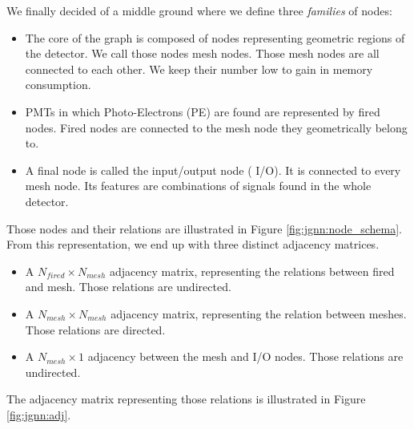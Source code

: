 \documentclass[../main.tex]{subfiles}
\begin{document}
We finally decided of a middle ground where we define three \textit{families} of nodes:
\begin{itemize}
  \item The core of the graph is composed of nodes representing geometric regions of the detector. We call those nodes {\color{Dandelion} mesh} nodes. Those mesh nodes are all connected to each other. We keep their number low to gain in memory consumption.
  \item PMTs in which Photo-Electrons (PE) are found are represented by {\color{red} fired} nodes. Fired nodes are connected to the mesh node they geometrically belong to.
  \item A final node is called the input/output node ({\color{blue} I/O}). It is connected to every mesh node.  Its features are combinations of signals found in the whole detector.
\end{itemize}

\hfill

Those nodes and their relations are illustrated in Figure \ref{fig:jgnn:node_schema}. From this representation, we end up with three distinct adjacency matrices.
\begin{itemize}
  \item A $N_{fired} \times N_{mesh}$ adjacency matrix, representing the relations between fired and mesh. Those relations are undirected.
  \item A $N_{mesh} \times N_{mesh}$ adjacency matrix, representing the relation between meshes. Those relations are directed.
  \item A $N_{mesh} \times 1$ adjacency between the mesh and I/O nodes. Those relations are undirected.
\end{itemize}
The adjacency matrix representing those relations is illustrated in Figure \ref{fig:jgnn:adj}.
\end{document}
